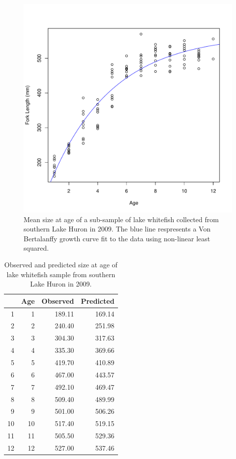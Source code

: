 \documentclass{article}
\begin{document}
\begin{figure}
  \begin{center} 
     \includegraphics[width=\textwidth]{plot_fit} 
  \end{center} 
  \caption{Mean size at age of a sub-sample of lake whitefish
    collected from southern Lake Huron in 2009.  The blue line
    respresents a Von Bertalanffy growth curve fit to the data using
    non-linear least squared.}
  \label{fig:plot_fit}
\end{figure}


\begin{table}[ht]
\centering
\begin{tabular}{rrrr}
  \hline
 & Age & Observed & Predicted \\ 
  \hline
1 &   1 & 189.11 & 169.14 \\ 
  2 &   2 & 240.40 & 251.98 \\ 
  3 &   3 & 304.30 & 317.63 \\ 
  4 &   4 & 335.30 & 369.66 \\ 
  5 &   5 & 419.70 & 410.89 \\ 
  6 &   6 & 467.00 & 443.57 \\ 
  7 &   7 & 492.10 & 469.47 \\ 
  8 &   8 & 509.40 & 489.99 \\ 
  9 &   9 & 501.00 & 506.26 \\ 
  10 &  10 & 517.40 & 519.15 \\ 
  11 &  11 & 505.50 & 529.36 \\ 
  12 &  12 & 527.00 & 537.46 \\ 
   \hline
\end{tabular}
\caption{Observed and predicted size at age of lake whitefish sample from southern Lake Huron in 2009.} 
\label{tbl:size-at-age}
\end{table}
\end{document}
